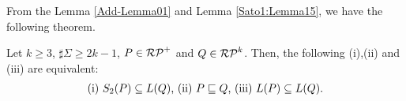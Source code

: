 From the Lemma \ref{Add-Lemma01} %
and Lemma \ref{Sato1:Lemma15}, %
we have the following theorem.


\begin{thm}\label{Theorem17}%
    Let $k \geq 3$, $\sharp\Sigma \geq 2k-1$, $P \in \mathcal{RP}^{+}$ and
    $Q \in \mathcal{RP}^{k}$.
    Then, the following (i),(ii) and (iii) are equivalent:
    \[
        \begin{tabular}{ll}
            $(\mathrm{i})$ $S_{2}(P) \subseteq L(Q)$,
            $(\mathrm{ii})$ $P \sqsubseteq Q$,
            $(\mathrm{iii})$ $L(P) \subseteq L(Q)$.
        \end{tabular}
    \]
\end{thm}


